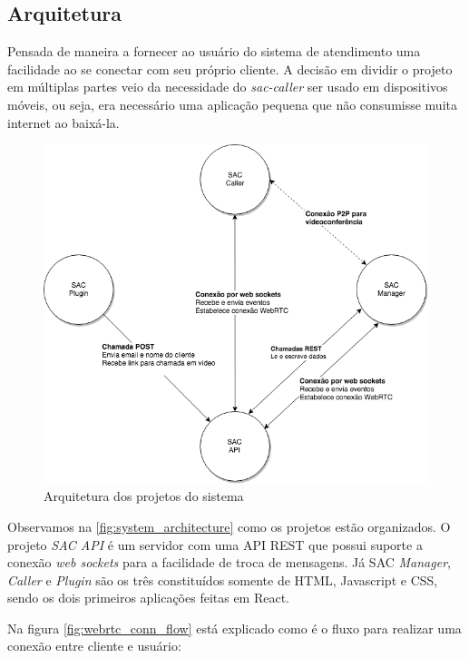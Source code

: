 \clearpage
\subsection{Arquitetura}

Pensada de maneira a fornecer ao usuário do sistema de atendimento uma facilidade ao se conectar com seu próprio cliente. A decisão em dividir o projeto em múltiplas partes veio da necessidade do \textit{sac-caller} ser usado em dispositivos móveis, ou seja, era necessário uma aplicação pequena que não consumisse muita internet ao baixá-la.

\begin{figure}[ht!]
	\centering
    \includegraphics[scale=0.6]{figures/system-architecture.png} 
	\caption{Arquitetura dos projetos do sistema}
	\label{fig:system_architecture}
\end{figure}

Observamos na \autoref{fig:system_architecture} como os projetos estão organizados. O projeto \textit{SAC API} é um servidor com uma API REST que possui suporte a conexão \textit{web sockets} para a facilidade de troca de mensagens. Já SAC \textit{Manager}, \textit{Caller} e \textit{Plugin} são os três constituídos somente de HTML, Javascript e CSS, sendo os dois primeiros aplicações feitas em React.

Na figura \autoref{fig:webrtc_conn_flow} está explicado como é o fluxo para realizar uma conexão entre cliente e usuário:


